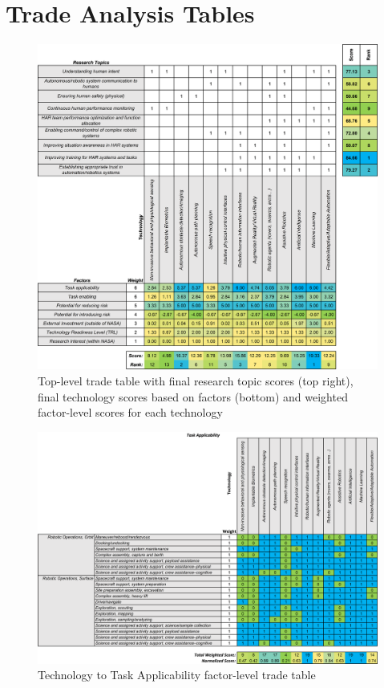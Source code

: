 % 
% 
\chapter{Trade Analysis Tables} \label{appendix:trade-tables}

\begin{figure}[b!]
    \begin{center}
        \includegraphics[width=0.8\linewidth]{figures/TradeStudy/figurea1.png}
        \caption{Top-level trade table with final research topic scores (top right), final technology scores based on factors (bottom) and weighted factor-level scores for each technology}
    \end{center}
\end{figure}

\begin{figure}[b!]
    \begin{center}
        \includegraphics[width=0.8\linewidth]{figures/TradeStudy/figurea2.png}
        \caption{Technology to Task Applicability factor-level trade table}
    \end{center}
\end{figure}

